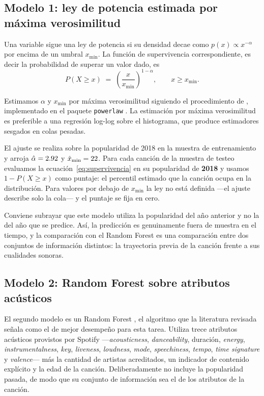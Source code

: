 \documentclass[11pt,a4paper]{article}
\begin{document}
\subsection{Modelo 1: ley de potencia estimada por máxima verosimilitud}

Una variable sigue una ley de potencia si su densidad decae como
$p(x) \propto x^{-\alpha}$ por encima de un umbral $x_{\min}$. La función de
supervivencia correspondiente, es decir la probabilidad de superar un valor
dado, es
\begin{equation}
  P(X \geq x) \;=\; \left(\frac{x}{x_{\min}}\right)^{1-\alpha},
  \qquad x \geq x_{\min}.
  \label{eq:supervivencia}
\end{equation}

Estimamos $\alpha$ y $x_{\min}$ por máxima verosimilitud siguiendo el
procedimiento de \citet{clauset2009}, implementado en el paquete
\texttt{powerlaw} \citep{alstott2014}. La estimación por máxima verosimilitud
es preferible a una regresión log-log sobre el histograma, que produce
estimadores sesgados en colas pesadas.

El ajuste se realiza sobre la popularidad de 2018 en la muestra de
entrenamiento y arroja $\hat{\alpha} = 2.92$ y
$\hat{x}_{\min} = 22$. Para cada canción de la muestra de testeo
evaluamos la ecuación~\eqref{eq:supervivencia} en su popularidad de
\textbf{2018} y usamos $1 - P(X \geq x)$ como puntaje: el percentil estimado
que la canción ocupa en la distribución. Para valores por debajo de
$x_{\min}$ la ley no está definida ---el ajuste describe solo la cola--- y el
puntaje se fija en cero.

Conviene subrayar que este modelo utiliza la popularidad del año anterior y
no la del año que se predice. Así, la predicción es genuinamente fuera de
muestra en el tiempo, y la comparación con el Random Forest es una
comparación entre dos conjuntos de información distintos: la trayectoria
previa de la canción frente a sus cualidades sonoras.

\subsection{Modelo 2: Random Forest sobre atributos acústicos}

El segundo modelo es un Random Forest \citep{breiman2001}, el algoritmo que
la literatura revisada señala como el de mejor desempeño para esta tarea.
Utiliza trece atributos acústicos provistos por Spotify
---\textit{acousticness}, \textit{danceability}, duración, \textit{energy},
\textit{instrumentalness}, \textit{key}, \textit{liveness},
\textit{loudness}, \textit{mode}, \textit{speechiness}, \textit{tempo},
\textit{time signature} y \textit{valence}--- más la cantidad de artistas
acreditados, un indicador de contenido explícito y la edad de la canción.
Deliberadamente no incluye la popularidad pasada, de modo que su conjunto de
información sea el de los atributos de la canción.
\end{document}
